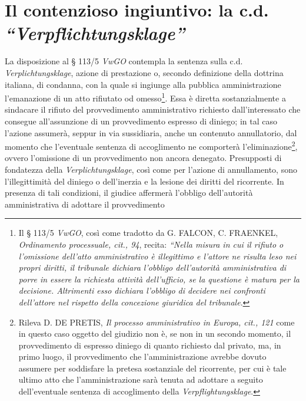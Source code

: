 \documentclass[12pt,it,a4paper,]{report}
\begin{document}
\hypertarget{il-contenzioso-ingiuntivo-la-c.d.-verpflichtungsklage}{%
\section{\texorpdfstring{Il contenzioso ingiuntivo: la c.d.
\emph{``Verpflichtungsklage''}}{Il contenzioso ingiuntivo: la c.d. ``Verpflichtungsklage''}}\label{il-contenzioso-ingiuntivo-la-c.d.-verpflichtungsklage}}

La disposizione al § 113/5 \emph{VwGO} contempla la sentenza sulla c.d.
\emph{Verplichtungsklage}, azione di prestazione o, secondo definizione
della dottrina italiana, di condanna, con la quale si ingiunge alla
pubblica amministrazione l'emanazione di un atto rifiutato od
omesso\footnote{Il § 113/5 \emph{VwGO}, così come tradotto da G. FALCON,
  C. FRAENKEL, \emph{Ordinamento processuale, cit., 94}, recita:
  \emph{``Nella misura in cui il rifiuto o l'omissione dell'atto
  amministrativo è illegittimo e l'attore ne risulta leso nei propri
  diritti, il tribunale dichiara l'obbligo dell'autorità amministrativa
  di porre in essere la richiesta attività dell'ufficio, se la questione
  è matura per la decisione. Altrimenti esso dichiara l'obbligo di
  decidere nei confronti dell'attore nel rispetto della concezione
  giuridica del tribunale}.}. Essa è diretta sostanzialmente a sindacare
il rifiuto del provvedimento amministrativo richiesto dall'interessato
che consegue all'assunzione di un provvedimento espresso di diniego; in
tal caso l'azione assumerà, seppur in via sussidiaria, anche un
contenuto annullatorio, dal momento che l'eventuale sentenza di
accoglimento ne comporterà l'eliminazione\footnote{Rileva D. DE PRETIS,
  \emph{Il processo amministrativo in Europa, cit., 121} come in questo
  caso oggetto del giudizio non è, se non in un secondo momento, il
  provvedimento di espresso diniego di quanto richiesto dal privato, ma,
  in primo luogo, il provvedimento che l'amministrazione avrebbe dovuto
  assumere per soddisfare la pretesa sostanziale del ricorrente, per cui
  è tale ultimo atto che l'amministrazione sarà tenuta ad adottare a
  seguito dell'eventuale sentenza di accoglimento della
  \emph{Verpflightungsklage}.}, ovvero l'omissione di un provvedimento
non ancora denegato. Presupposti di fondatezza della
\emph{Verplichtungsklage}, così come per l'azione di annullamento, sono
l'illegittimità del diniego o dell'inerzia e la lesione dei diritti del
ricorrente. In presenza di tali condizioni, il giudice affermerà
l'obbligo dell'autorità amministrativa di adottare il provvedimento
\end{document}
